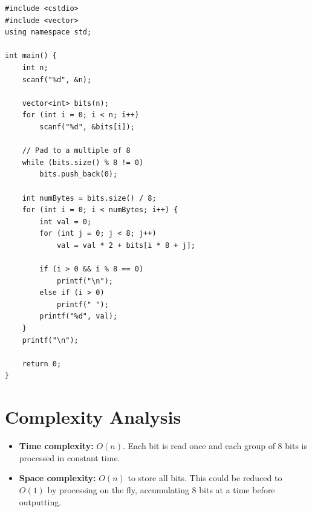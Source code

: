 \documentclass[11pt,a4paper]{article}
\begin{document}
\begin{lstlisting}
#include <cstdio>
#include <vector>
using namespace std;

int main() {
    int n;
    scanf("%d", &n);

    vector<int> bits(n);
    for (int i = 0; i < n; i++)
        scanf("%d", &bits[i]);

    // Pad to a multiple of 8
    while (bits.size() % 8 != 0)
        bits.push_back(0);

    int numBytes = bits.size() / 8;
    for (int i = 0; i < numBytes; i++) {
        int val = 0;
        for (int j = 0; j < 8; j++)
            val = val * 2 + bits[i * 8 + j];

        if (i > 0 && i % 8 == 0)
            printf("\n");
        else if (i > 0)
            printf(" ");
        printf("%d", val);
    }
    printf("\n");

    return 0;
}
\end{lstlisting}

\section{Complexity Analysis}

\begin{itemize}
  \item \textbf{Time complexity:} $O(n)$. Each bit is read once and each group
        of 8 bits is processed in constant time.
  \item \textbf{Space complexity:} $O(n)$ to store all bits. This could be reduced to
        $O(1)$ by processing on the fly, accumulating 8 bits at a time before outputting.
\end{itemize}
\end{document}
